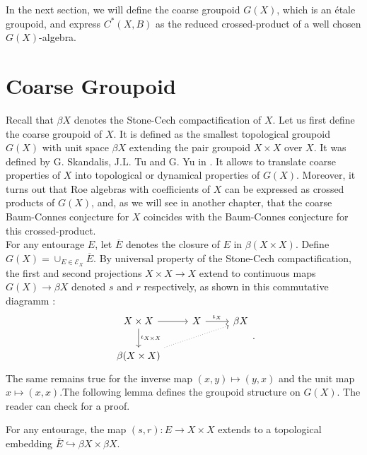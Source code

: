In the next section, we will define the coarse groupoid $G(X)$, which is an étale groupoid, and express $C^*(X,B)$ as the reduced crossed-product of a well chosen $G(X)$-algebra.


\section{Coarse Groupoid}  %


Recall that $\beta X$ denotes the Stone-Cech compactification of $X$. Let us first define the coarse groupoid of $X$. It is defined as the smallest topological groupoid $G(X)$ with unit space $\beta X$ extending the pair groupoid $X\times X$ over $X$. It was defined by G. Skandalis, J.L. Tu and G. Yu in \cite{SkTuYu}. It allows to translate coarse properties of $X$ into topological or dynamical properties of $G(X)$. Moreover, it turns out that Roe algebras with coefficients of $X$ can be expressed as crossed products of $G(X)$, and, as we will see in another chapter, that the coarse Baum-Connes conjecture for $X$ coincides with the Baum-Connes conjecture for this crossed-product.  \\

For any entourage $E$, let $\overline E$ denotes the closure of $E$ in $\beta (X\times X)$. Define $G(X) = \cup_{E\in\mathcal E_X} \overline E$. By universal property of the Stone-Cech compactification, the first and second projections $X\times X\rightarrow X$ extend to continuous maps $G(X)\rightarrow \beta X$ denoted $s$ and $r$ respectively, as shown in this commutative diagramm :  
\[\begin{tikzcd}
X\times X \arrow{r}\arrow{d}{\iota_{X\times X}} &  X \arrow{r}{\iota_X} & \beta X \\
\beta (X\times X) \arrow[dotted]{urr} & & 
\end{tikzcd}.\]
The same remains true for the inverse map $(x,y)\mapsto (y,x)$ and the unit map $x\mapsto (x,x)$.The following lemma defines the groupoid structure on $G(X)$. The reader can check \cite{RoeCoarse} for a proof.

\begin{lem}\cite{RoeCoarse}
For any entourage, the map $(s,r) : E\rightarrow X\times X$ extends to a topological embedding $\overline E \hookrightarrow \beta X\times \beta X$.
\end{lem}

